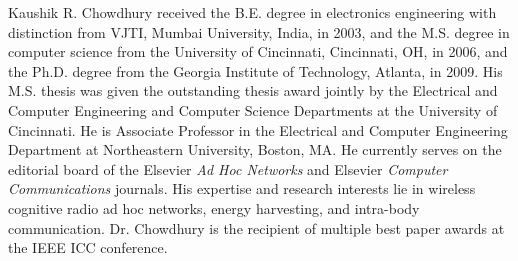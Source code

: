 \documentclass[10pt,journal,cspaper,compsoc]{IEEEtran}
\begin{document}
\begin{IEEEbiography}{Kaushik R. Chowdhury}
	received the B.E. degree in electronics engineering with distinction from VJTI, Mumbai University, India, in 2003, and the M.S. degree in computer science from the University of Cincinnati, Cincinnati, OH, in 2006, and the Ph.D. degree from the Georgia Institute of Technology, Atlanta, in 2009. His M.S. thesis was given the outstanding thesis award jointly by the Electrical and Computer Engineering and Computer Science Departments at the University of Cincinnati. He is Associate Professor in the Electrical and Computer Engineering Department at Northeastern University, Boston, MA. He currently serves on the editorial board of the Elsevier \textit{Ad Hoc Networks} and Elsevier \textit{Computer Communications} journals. His expertise and research interests lie in wireless cognitive radio ad hoc networks, energy harvesting, and intra-body communication. Dr. Chowdhury is the recipient of multiple best paper awards at the IEEE ICC conference.
\end{IEEEbiography}
\end{document}
